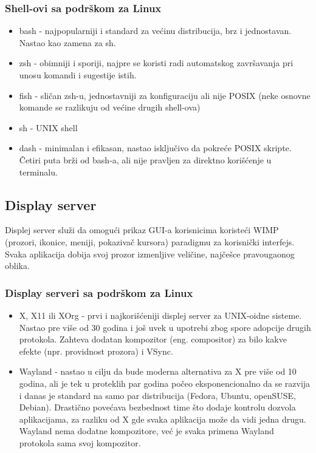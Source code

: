 \documentclass[a4paper,14pt]{article}
\begin{document}
\subsubsection{Shell-ovi sa podrškom za Linux}
\begin{itemize}
\item bash - najpopularniji i standard za većinu distribucija, brz i jednostavan. Nastao kao zamena za sh.
\item zsh - obimniji i sporiji, najpre se koristi radi automatskog završavanja pri unosu komandi i sugestije istih.
\item fish - sličan zsh-u, jednostavniji za konfiguraciju ali nije POSIX (neke osnovne komande se razlikuju od većine drugih shell-ova)
\item sh - UNIX shell
\item dash - minimalan i efikasan, nastao isključivo da pokreće POSIX skripte. Četiri puta brži od bash-a, ali nije pravljen za direktno korišćenje u terminalu.
\end{itemize}

\subsection{Display server}
Displej server služi da omogući prikaz GUI-a korisnicima koristeći WIMP (prozori, ikonice, meniji, pokazivač kursora) paradigmu za korisnički interfejs. Svaka aplikacija dobija svoj prozor izmenljive veličine, najčešce pravougaonog oblika.
\subsubsection{Display serveri sa podrškom za Linux}
\begin{itemize}
\item X, X11 ili XOrg - prvi i najkorišćeniji displej server za UNIX-oidne sisteme. Nastao pre više od 30 godina i još uvek u upotrebi zbog spore adopcije drugih protokola. Zahteva dodatan kompozitor (eng. compositor) za bilo kakve efekte (npr. providnost prozora) i VSync.
\item Wayland - nastao u cilju da bude moderna alternativa za X pre više od 10 godina, ali je tek u proteklih par godina počeo eksponencionalno da se razvija i danas je standard na samo par distribucija (Fedora, Ubuntu, openSUSE, Debian). Drastično povećava bezbednost time što dodaje kontrolu dozvola aplikacijama, za razliku od X gde svaka aplikacija može da vidi jedna drugu. Wayland nema dodatne kompozitore, već je svaka primena Wayland protokola sama svoj kompozitor.
\end{itemize}
\newpage
\end{document}
